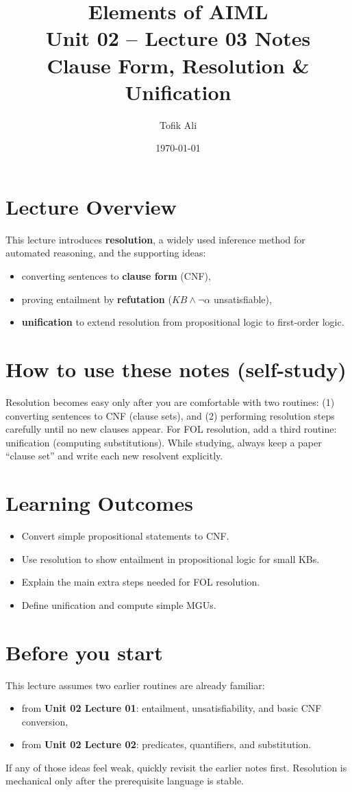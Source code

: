 \documentclass[11pt]{article}
\title{Elements of AIML\\Unit 02 -- Lecture 03 Notes\\Clause Form, Resolution \& Unification}
\author{Tofik Ali}
\date{\today}
\begin{document}
\maketitle
\tableofcontents

\section{Lecture Overview}
This lecture introduces \textbf{resolution}, a widely used inference method for automated reasoning, and the supporting ideas:
\begin{itemize}[leftmargin=*]
  \item converting sentences to \textbf{clause form} (CNF),
  \item proving entailment by \textbf{refutation} ($KB \land \lnot \alpha$ unsatisfiable),
  \item \textbf{unification} to extend resolution from propositional logic to first-order logic.
\end{itemize}
\notesources{\AIMLUnitIISources}

\section{How to use these notes (self-study)}
Resolution becomes easy only after you are comfortable with two routines:
(1) converting sentences to CNF (clause sets), and (2) performing resolution steps carefully until no new clauses appear.
For FOL resolution, add a third routine: unification (computing substitutions).
While studying, always keep a paper ``clause set'' and write each new resolvent explicitly.

\section{Learning Outcomes}
\begin{itemize}[leftmargin=*]
  \item Convert simple propositional statements to CNF.
  \item Use resolution to show entailment in propositional logic for small KBs.
  \item Explain the main extra steps needed for FOL resolution.
  \item Define unification and compute simple MGUs.
\end{itemize}

\section{Before you start}
This lecture assumes two earlier routines are already familiar:
\begin{itemize}[leftmargin=*]
  \item from \textbf{Unit 02 Lecture 01}: entailment, unsatisfiability, and basic CNF conversion,
  \item from \textbf{Unit 02 Lecture 02}: predicates, quantifiers, and substitution.
\end{itemize}
If any of those ideas feel weak, quickly revisit the earlier notes first. Resolution is mechanical only after the prerequisite language is stable.
\end{document}
